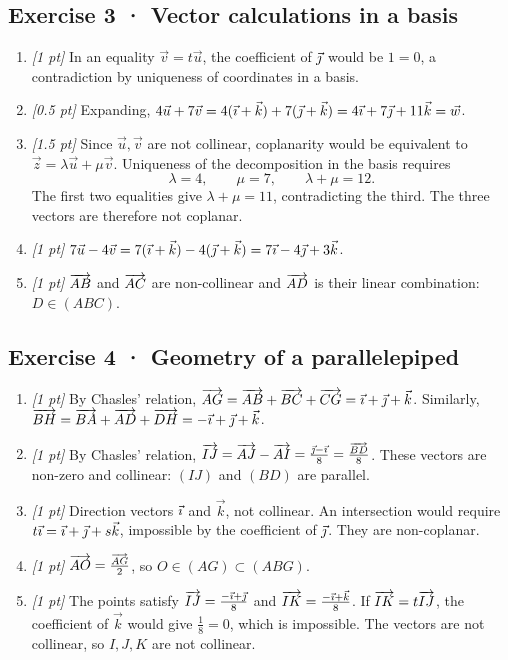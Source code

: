 \subsection*{Exercise 3 · Vector calculations in a basis}\begin{enumerate}

\item \textit{[1 pt]} In an equality $\vec v=t\vec u$, the coefficient of $\vec{\jmath} $ would be $1=0$, a contradiction by uniqueness of coordinates in a basis.

\item \textit{[0.5 pt]} Expanding, $4\vec u+7\vec v=4(\vec{\imath} +\vec k)+7(\vec{\jmath} +\vec k)=4\vec{\imath} +7\vec{\jmath} +11\vec k=\vec w$.

\item \textit{[1.5 pt]} Since $\vec u,\vec v$ are not collinear, coplanarity would be equivalent to $\vec z=\lambda\vec u+\mu\vec v$. Uniqueness of the decomposition in the basis requires
\[\lambda=4,\qquad\mu=7,\qquad\lambda+\mu=12.\]
The first two equalities give $\lambda+\mu=11$, contradicting the third. The three vectors are therefore not coplanar.

\item \textit{[1 pt]} $7\vec u-4\vec v=7(\vec{\imath} +\vec k)-4(\vec{\jmath} +\vec k)=7\vec{\imath} -4\vec{\jmath} +3\vec k$.

\item \textit{[1 pt]} $\overrightarrow{AB}$ and $\overrightarrow{AC}$ are non-collinear and $\overrightarrow{AD}$ is their linear combination: $D\in(ABC)$.

\end{enumerate}

\subsection*{Exercise 4 · Geometry of a parallelepiped}\begin{enumerate}

\item \textit{[1 pt]} By Chasles' relation, $\overrightarrow{AG}=\overrightarrow{AB}+\overrightarrow{BC}+\overrightarrow{CG}=\vec{\imath} +\vec{\jmath} +\vec k$. Similarly, $\overrightarrow{BH}=\overrightarrow{BA}+\overrightarrow{AD}+\overrightarrow{DH}=-\vec{\imath} +\vec{\jmath} +\vec k$.

\item \textit{[1 pt]} By Chasles' relation, $\overrightarrow{IJ}=\overrightarrow{AJ}-\overrightarrow{AI}=\frac{\vec{\jmath} -\vec{\imath} }{8}=\frac{\overrightarrow{BD}}{8}$. These vectors are non-zero and collinear: $(IJ)$ and $(BD)$ are parallel.

\item \textit{[1 pt]} Direction vectors $\vec{\imath} $ and $\vec k$, not collinear. An intersection would require $t\vec{\imath} =\vec{\imath} +\vec{\jmath} +s\vec k$, impossible by the coefficient of $\vec{\jmath} $. They are non-coplanar.

\item \textit{[1 pt]} $\overrightarrow{AO}=\frac{\overrightarrow{AG}}{2}$, so $O\in(AG)\subset(ABG)$.

\item \textit{[1 pt]} The points satisfy $\overrightarrow{IJ}=\frac{-\vec{\imath} +\vec{\jmath} }{8}$ and $\overrightarrow{IK}=\frac{-\vec{\imath} +\vec k}{8}$. If $\overrightarrow{IK}=t\overrightarrow{IJ}$, the coefficient of $\vec k$ would give $\frac{1}{8}=0$, which is impossible. The vectors are not collinear, so $I,J,K$ are not collinear.

\end{enumerate}

